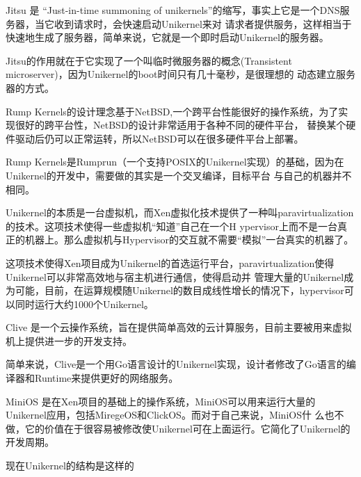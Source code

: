 \documentclass[fontsize=13pt, %
    paper=a4, %
    twoside, %
    captions=tableheading,
    index=totoc,
    hyperref]{labbook}
\begin{document}
\begin{spacing}{1.0}
\begin{addmargin}[4cm]{0cm}


Jitsu 是 “Just-in-time summoning of unikernels”的缩写，事实上它是一个DNS服务器，当它收到请求时，会快速启动Unikernel来对
请求者提供服务，这样相当于快速地生成了服务器，简单来说，它就是一个即时启动Unikernel的服务器。

Jitsu的作用就在于它实现了一个叫临时微服务器的概念(Transistent microserver)，因为Unikernel的boot时间只有几十毫秒，是很理想的
动态建立服务器的方式。


Rump Kernels的设计理念基于NetBSD,一个跨平台性能很好的操作系统，为了实现很好的跨平台性，NetBSD的设计非常适用于各种不同的硬件平台，
替换某个硬件驱动后仍可以正常运转，所以NetBSD可以在很多硬件平台上部署。

Rump Kernels是Rumprun（一个支持POSIX的Unikernel实现）的基础，因为在Unikernel的开发中，需要做的其实是一个交叉编译，目标平台
与自己的机器并不相同。


Unikernel的本质是一台虚拟机，而Xen虚拟化技术提供了一种叫paravirtualization的技术。这项技术使得一些虚拟机“知道”自己在一个H
ypervisor上而不是一台真正的机器上。那么虚拟机与Hypervisor的交互就不需要“模拟”一台真实的机器了。

这项技术使得Xen项目成为Unikernel的首选运行平台，paravirtualization使得Unikernel可以非常高效地与宿主机进行通信，使得启动并
管理大量的Unikernel成为可能，目前，在运算规模随Unikernel的数目成线性增长的情况下，hypervisor可以同时运行大约1000个Unikernel。


Clive 是一个云操作系统，旨在提供简单高效的云计算服务，目前主要被用来虚拟机上提供进一步的开发支持。

简单来说，Clive是一个用Go语言设计的Unikernel实现，设计者修改了Go语言的编译器和Runtime来提供更好的网络服务。


MiniOS 是在Xen项目的基础上的操作系统，MiniOS可以用来运行大量的Unikernel应用，包括MiregeOS和ClickOS。而对于自己来说，MiniOS什
么也不做，它的价值在于很容易被修改使Unikernel可在上面运行。它简化了Unikernel的开发周期。



现在Unikernel的结构是这样的


\end{addmargin}
\end{spacing}
\end{document}
